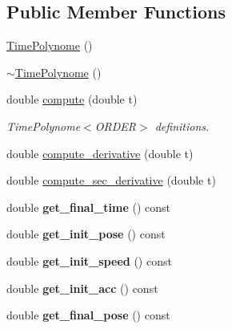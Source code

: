 \subsection*{Public Member Functions}
\begin{DoxyCompactItemize}
\item 
\hyperlink{classblmc__robots_1_1TimePolynome_a0855aaf796c9d67302a5f2225355d745}{Time\+Polynome} ()
\item 
\hyperlink{classblmc__robots_1_1TimePolynome_add49c99d57206a93c9217f374f51700a}{$\sim$\+Time\+Polynome} ()
\item 
double \hyperlink{classblmc__robots_1_1TimePolynome_a644871336a78055c4e27e9b52e75ad8c}{compute} (double t)
\begin{DoxyCompactList}\small\item\em Time\+Polynome$<$\+O\+R\+D\+E\+R$>$ definitions. \end{DoxyCompactList}\item 
double \hyperlink{classblmc__robots_1_1TimePolynome_a089cd5e46da974828cfb1b042119c163}{compute\+\_\+derivative} (double t)
\item 
double \hyperlink{classblmc__robots_1_1TimePolynome_a3402f5a2e56b7ef46d93342f8c208bd1}{compute\+\_\+sec\+\_\+derivative} (double t)
\item 
double {\bfseries get\+\_\+final\+\_\+time} () const \hypertarget{classblmc__robots_1_1TimePolynome_acf5dd908694b2b9b23239a9843df2dee}{}\label{classblmc__robots_1_1TimePolynome_acf5dd908694b2b9b23239a9843df2dee}

\item 
double {\bfseries get\+\_\+init\+\_\+pose} () const \hypertarget{classblmc__robots_1_1TimePolynome_a2ebd9e40c57231bbbc409c56755cb9e7}{}\label{classblmc__robots_1_1TimePolynome_a2ebd9e40c57231bbbc409c56755cb9e7}

\item 
double {\bfseries get\+\_\+init\+\_\+speed} () const \hypertarget{classblmc__robots_1_1TimePolynome_a969af61ea4669c8936dbd356a851caed}{}\label{classblmc__robots_1_1TimePolynome_a969af61ea4669c8936dbd356a851caed}

\item 
double {\bfseries get\+\_\+init\+\_\+acc} () const \hypertarget{classblmc__robots_1_1TimePolynome_a3eb5d7003ab1d18d7ffafd8bb28b309a}{}\label{classblmc__robots_1_1TimePolynome_a3eb5d7003ab1d18d7ffafd8bb28b309a}

\item 
double {\bfseries get\+\_\+final\+\_\+pose} () const \hypertarget{classblmc__robots_1_1TimePolynome_a2a6e493295cf8d6fbf3f82fb2a41b856}{}\label{classblmc__robots_1_1TimePolynome_a2a6e493295cf8d6fbf3f82fb2a41b856}


\end{DoxyCompactItemize}
